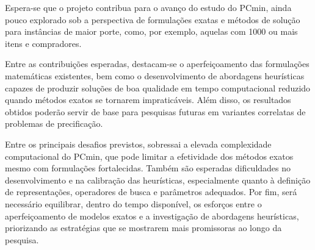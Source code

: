 

Espera-se que o projeto contribua para o avanço do estudo do PCmin, ainda pouco explorado sob a perspectiva de formulações exatas e métodos de solução para instâncias de maior porte, como, por exemplo, aquelas com 1000 ou mais itens e compradores. 

Entre as contribuições esperadas, destacam-se o aperfeiçoamento das formulações matemáticas existentes, bem como o desenvolvimento de abordagens heurísticas capazes de produzir soluções de boa qualidade em tempo computacional reduzido quando métodos exatos se tornarem impraticáveis. Além disso, os resultados obtidos poderão servir de base para pesquisas futuras em variantes correlatas de problemas de precificação.

Entre os principais desafios previstos, sobressai a elevada complexidade computacional do PCmin, que pode limitar a efetividade dos métodos exatos mesmo com formulações fortalecidas. Também são esperadas dificuldades no desenvolvimento e na calibração das heurísticas, especialmente quanto à definição de representações, operadores de busca e parâmetros adequados. Por fim, será necessário equilibrar, dentro do tempo disponível, os esforços entre o aperfeiçoamento de modelos exatos e a investigação de abordagens heurísticas, priorizando as estratégias que se mostrarem mais promissoras ao longo da pesquisa.